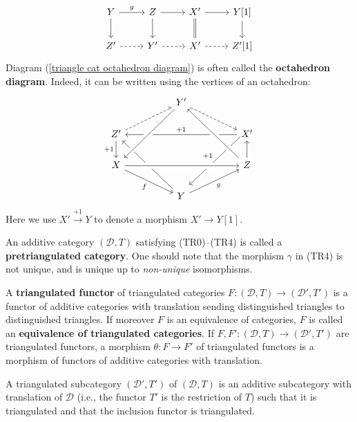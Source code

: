 \begin{definition}
\begin{enumerate}[leftmargin=40pt]
\begin{equation}
\begin{tikzcd}
    Y\ar[r,"g"]\ar[d]&Z\ar[r]\ar[d]&X'\ar[r]\ar[d,equal]&Y[1]\ar[d]\\
    Z'\ar[r,dashed]&Y'\ar[r,dashed]&X'\ar[r,dashed]&Z'[1]
    \end{tikzcd}
    \end{equation}
    Diagram (\ref{triangle cat octahedron diagram}) is often called the \textbf{octahedron diagram}. Indeed, it can be written using the vertices of an octahedron:
    \[\begin{tikzcd}
    &&Y'&&\\
    Z'&&&&X'\\
    X&&&&Z\\
    &&Y&&
    \arrow[from=2-1,to=1-3,dashed]
    \arrow[from=1-3,to=2-5,dashed]
    \arrow[from=2-1,to=3-1,swap,"+1"]
    \arrow[from=3-5,to=2-5]
    \arrow[from=2-5,to=4-3,swap,"+1",yshift=1ex]
    \arrow[from=4-3,to=2-1]
    \arrow[from=4-3,to=3-5,swap,"g"]
    \arrow[from=2-5,to=2-1,swap,"+1"]
    \arrow[from=3-5,to=1-3,crossing over]
    \arrow[from=3-1,to=4-3,swap,"f"]
    \arrow[from=1-3,to=3-1,crossing over]
    \arrow[from=3-1,to=3-5,crossing over]
    \end{tikzcd}\]
    Here we use $X'\stackrel{+1}{\to} Y$ to denote a morphism $X'\to Y[1]$.
\end{enumerate}
\end{definition}
An additive category $(\mathcal{D},T)$ satisfying (TR0)--(TR4) is called a \textbf{pretriangulated category}. One should note that the morphism $\gamma$ in (TR4) is not unique, and is unique up to \textit{non-unique} isomorphisms.

\begin{definition}
A \textbf{triangulated functor} of triangulated categories $F:(\mathcal{D},T)\to(\mathcal{D}',T')$ is a functor of additive categories with translation sending distinguished triangles to distinguished triangles. If moreover $F$ is an equivalence of categories, $F$ is called an \textbf{equivalence of triangulated categories}. If $F,F':(\mathcal{D},T)\to(\mathcal{D}',T')$ are triangulated functors, a morphism $\theta:F\to F'$ of triangulated functors is a morphism of functors of additive categories with translation.\par
A triangulated subcategory $(\mathcal{D}',T')$ of $(\mathcal{D},T)$ is an additive subcategory with translation of $\mathcal{D}$ (i.e., the functor $T'$ is the restriction of $T$) such that it is triangulated and that the inclusion functor is triangulated.
\end{definition}

